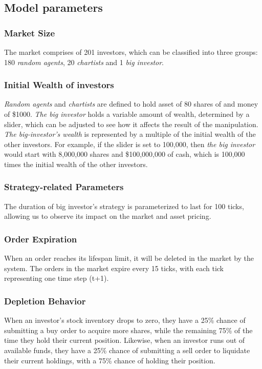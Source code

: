 \documentclass[a4paper, 12pt]{article}
\begin{document}
        
    \subsection{Model parameters}

        \subsubsection{Market Size}
            The market comprises of 201 investors, which can be classified into three groups: 180 \emph{random agents}, 20 \emph{chartists} and 1 \emph{big investor}.
            
        
        \subsubsection{Initial Wealth of investors}
            \emph{Random agents} and \emph{chartists} are defined to hold asset of 80 shares of and money of \$1000. \emph{The big investor} holds a variable amount of wealth, determined by a slider, which can be adjusted to see how it affects the result of the manipulation. \emph{The big-investor's wealth} is represented by a multiple of the initial wealth of the other investors. For example, if the slider is set to 100,000, then \emph{the big investor} would start with 8,000,000 shares and \$100,000,000 of cash, which is 100,000 times the initial wealth of the other investors.

        \subsubsection{Strategy-related Parameters}
            
            The duration of big investor's strategy is parameterized to last for 100 ticks, allowing us to observe its impact on the market and asset pricing.

        \subsubsection{Order Expiration}    
            When an order reaches its lifespan limit, it will be deleted in the market by the system. The orders in the market expire every 15 ticks, with each tick representing one time step (t+1).

        \subsubsection{Depletion Behavior}
            When an investor's stock inventory drops to zero, they have a 25\% chance of submitting a buy order to acquire more shares, while the remaining 75\% of the time they hold their current position. Likewise, when an investor runs out of available funds, they have a 25\% chance of submitting a sell order to liquidate their current holdings, with a 75\% chance of holding their position. 
\end{document}
